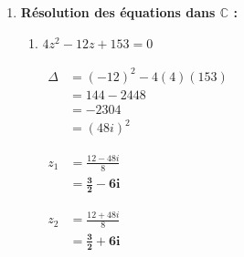 \documentclass[12pt,a4paper]{article}
\begin{document}
\begin{enumerate}
\begin{enumerate}
        $
        \begin{aligned}
            (L_1) + (L_2) &\implies 2x^2 = 32\\
            &\implies x^2 = 16\\
            &\implies x = 4 \text{ ou } x = -4
        \end{aligned}
        $
        
        $
        \begin{aligned}
            (L_2) - (L_1) &\implies 2y^2 = 18\\
            &\implies y^2 = 9\\
            &\implies y = 3 \text{ ou } y = -3
        \end{aligned}
        $
        
        $
        \begin{aligned}
            (L_3) &\implies xy = 12 > 0
        \end{aligned}
        $
        
        Donc $x$ et $y$ sont de même signe. Les racines carrées de $7 + 24i$ sont donc $\mathbf{4 + 3i}$ et $\mathbf{-4 - 3i}$.
    \end{enumerate}

    \item \textbf{Résolution des équations dans $\mathbb{C}$ :}
    
    \begin{enumerate}
        \item $4z^2 - 12z + 153 = 0$
        
        $
        \begin{aligned}
            \Delta &= (-12)^2 - 4(4)(153)\\
            &= 144 - 2448\\
            &= -2304\\
            &= (48i)^2
        \end{aligned}
        $
        
        $
        \begin{aligned}
            z_1 &= \frac{12 - 48i}{8}\\
            &= \mathbf{\frac{3}{2} - 6i}
        \end{aligned}
        $
        
        $
        \begin{aligned}
            z_2 &= \frac{12 + 48i}{8}\\
            &= \mathbf{\frac{3}{2} + 6i}
        \end{aligned}
        $
        

\end{enumerate}
\end{enumerate}
\end{document}
